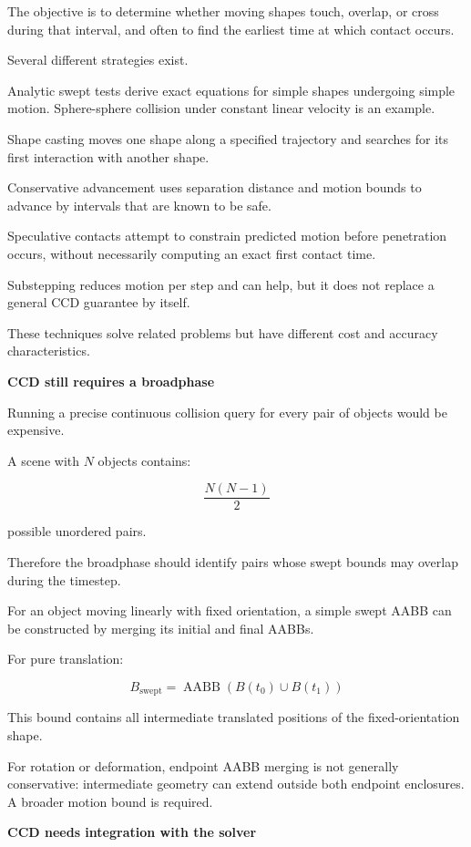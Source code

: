 The objective is to determine whether moving shapes touch, overlap, or cross during that interval, and often to find the earliest time at which contact occurs.

Several different strategies exist.

Analytic swept tests derive exact equations for simple shapes undergoing simple motion. Sphere-sphere collision under constant linear velocity is an example.

Shape casting moves one shape along a specified trajectory and searches for its first interaction with another shape.

Conservative advancement uses separation distance and motion bounds to advance by intervals that are known to be safe.

Speculative contacts attempt to constrain predicted motion before penetration occurs, without necessarily computing an exact first contact time.

Substepping reduces motion per step and can help, but it does not replace a general CCD guarantee by itself.

These techniques solve related problems but have different cost and accuracy characteristics.

\textbf{CCD still requires a broadphase}

Running a precise continuous collision query for every pair of objects would be expensive.

A scene with \(N\) objects contains:

\[
\frac{N(N-1)}2
\]

possible unordered pairs.

Therefore the broadphase should identify pairs whose swept bounds may overlap during the timestep.

For an object moving linearly with fixed orientation, a simple swept AABB can be constructed by merging its initial and final AABBs.

For pure translation:

\[
\boxed{ B_{\mathrm{swept}} = \operatorname{AABB}(B(t_0)\cup B(t_1)) }
\]

This bound contains all intermediate translated positions of the fixed-orientation shape.

For rotation or deformation, endpoint AABB merging is not generally conservative: intermediate geometry can extend outside both endpoint enclosures. A broader motion bound is required.

\textbf{CCD needs integration with the solver}

